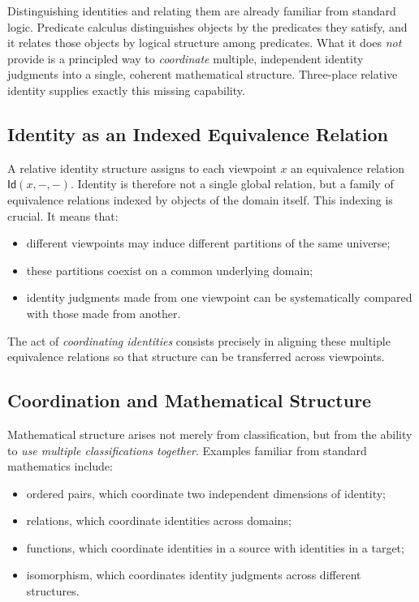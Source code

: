 \documentclass[11pt, a4paper]{article}
\theoremstyle{remark}
\newcommand{\Id}{\mathsf{Id}}
\begin{document}
Distinguishing identities and relating them are already familiar from standard logic. Predicate calculus distinguishes objects by the predicates they satisfy, and it relates those objects by logical structure among predicates. What it does \emph{not} provide is a principled way to \emph{coordinate} multiple, independent identity judgments into a single, coherent mathematical structure. Three-place relative identity supplies exactly this missing capability.

\subsection{Identity as an Indexed Equivalence Relation}

A relative identity structure assigns to each viewpoint $x$ an equivalence relation $\Id(x,-,-)$. Identity is therefore not a single global relation, but a family of equivalence relations indexed by objects of the domain itself. This indexing is crucial. It means that:
\begin{itemize}
    \item different viewpoints may induce different partitions of the same universe;
    \item these partitions coexist on a common underlying domain;
    \item identity judgments made from one viewpoint can be systematically compared with those made from another.
\end{itemize}

The act of \emph{coordinating identities} consists precisely in aligning these multiple equivalence relations so that structure can be transferred across viewpoints.

\subsection{Coordination and Mathematical Structure}

Mathematical structure arises not merely from classification, but from the ability to \emph{use multiple classifications together}. Examples familiar from standard mathematics include:
\begin{itemize}
    \item ordered pairs, which coordinate two independent dimensions of identity;
    \item relations, which coordinate identities across domains;
    \item functions, which coordinate identities in a source with identities in a target;
    \item isomorphism, which coordinates identity judgments across different structures.
\end{itemize}
\end{document}
